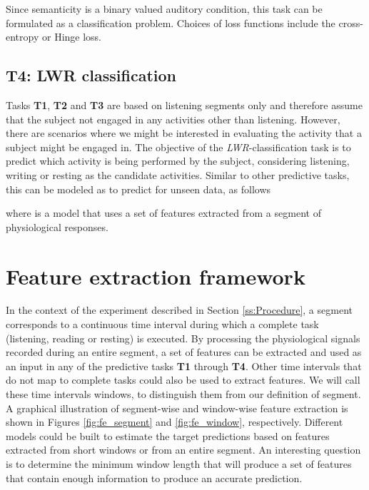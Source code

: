 \documentclass{article}
\begin{document}
Since semanticity is a binary valued auditory condition, this task can be formulated as a classification problem. Choices of loss functions include the cross-entropy or Hinge loss.

\subsection{\textbf{T4}: LWR classification} \label{ss:T4}
Tasks \textbf{T1}, \textbf{T2} and \textbf{T3} are based on listening segments only and therefore assume that the subject not engaged in any activities other than listening. However, there are scenarios where we might be interested in evaluating the activity that a subject might be engaged in.
The objective of the \textit{LWR}-classification task is to predict which activity  is being performed by the subject, considering listening, writing or resting as the candidate activities. Similar to other predictive tasks, this can be modeled as to predict  for unseen data, as follows

where  is a model that uses a set of features  extracted from a segment of physiological responses. 










\section{Feature extraction framework} \label{S:fExtraction}

In the context of the experiment described in Section \ref{ss:Procedure}, a segment corresponds to a continuous time interval during which a complete task (listening, reading or resting) is executed. By processing the physiological signals recorded during an entire segment, a set of features  can be extracted and used as an input in any of the predictive tasks \textbf{T1} through \textbf{T4}. Other time intervals that do not map to complete tasks could also be used to extract features. We will call these time intervals windows, to distinguish them from our definition of segment. A graphical illustration of segment-wise and window-wise feature extraction is shown in Figures  \ref{fig:fe_segment} and \ref{fig:fe_window}, respectively.
Different models could be built to estimate the target predictions based on features extracted from short windows or from an entire segment. An interesting question is to determine the minimum window length that will produce a set of features  that contain enough information to produce an accurate prediction.
\end{document}
